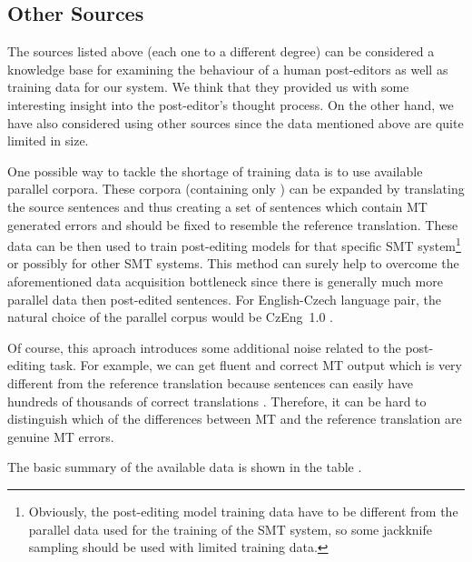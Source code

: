 \subsection{Other Sources}

The sources listed above (each one to a different degree) can
be considered a knowledge base for examining the behaviour of a human post-editors as well
as training data for our system. We think that they provided us with
some interesting insight into the post-editor's thought process. On the other hand,
we have also considered using other sources since the data mentioned above are quite
limited in size.

One possible way to tackle the shortage of training data is to use available parallel corpora.
These corpora (containing only )
can be expanded by translating the source sentences and thus creating a set of 
sentences which contain MT generated errors and should be fixed to resemble the 
reference translation. These data can be then used to train post-editing models for that
specific SMT system\footnote{Obviously, the post-editing model training data have to be
different from the parallel data used for the training of the SMT system, so
some
jackknife sampling should be used with limited training data.} or possibly for
other SMT systems.
This method can surely help to overcome the aforementioned data acquisition bottleneck
since there is generally much more parallel data then post-edited sentences. For
English-Czech language pair, the natural choice of the parallel corpus would be
CzEng~1.0 \citep{czeng10:lrec2012}.


Of course, this aproach introduces some additional noise
related to the post-editing task. For example, we can get fluent and correct MT output which
is very different from the reference translation
because sentences can easily have hundreds of thousands of correct translations \citep{biblio8445677574576847760}.
Therefore, it can be hard to distinguish which of the differences between
MT and the reference translation are genuine MT errors.

The basic summary of the available data is shown in the table .

